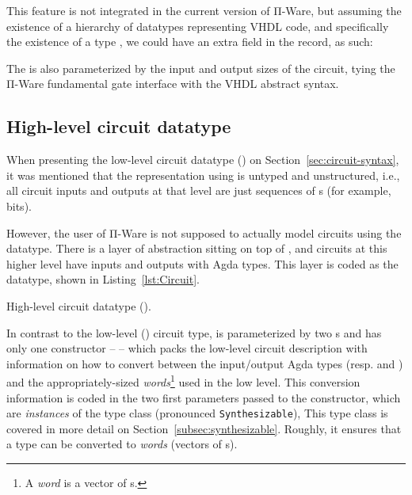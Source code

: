             This feature is not integrated in the current version of Π-Ware, but assuming the existence
            of a hierarchy of datatypes representing \ac{VHDL} code, and specifically the existence
            of a type , we could have an extra field in the  record, as such:

            \begin{center}
                \AY{:} \AY{(} \AY{:}  \AY{(} \AY{)}\AY{)}   \AY{(} \AY{)} \AY{(} \AY{)}
            \end{center}

            The  is also parameterized by the input and output sizes of the circuit,
            tying the Π-Ware fundamental gate interface with the \ac{VHDL} abstract syntax.



        \subsection{High-level circuit datatype}
        \label{subsec:high-level-circuit}
            When presenting the low-level circuit datatype () on Section~\ref{sec:circuit-syntax},
            it was mentioned that the representation using  is untyped and unstructured, i.e.,
            all circuit inputs and outputs at that level are just sequences of s (for example, bits).

            However, the user of Π-Ware is not supposed to actually model circuits using the  datatype.
            There is a layer of abstraction sitting on top of ,
            and circuits at this higher level have inputs and outputs with Agda types.
            This layer is coded as the  datatype, shown in Listing~\ref{lst:Circuit}.

            \begin{listing}[h]
                \caption{High-level circuit datatype ().\label{lst:Circuit}}
            \end{listing}

            In contrast to the low-level () circuit type,  is parameterized by two s
            and has only one constructor –  – which packs the low-level circuit description
            with information on how to convert between the input/output Agda types (resp.  and )
            and the appropriately-sized \emph{words}\footnote{A \emph{word} is a vector of s.}
            used in the low level.
            This conversion information is coded in the two first parameters passed to the  constructor,
            which are \emph{instances} of the  type class (pronounced \texttt{Synthesizable}),
            This type class is covered in more detail on Section~\ref{subsec:synthesizable}.
            Roughly, it ensures that a type can be converted to \emph{words} (vectors of s).


